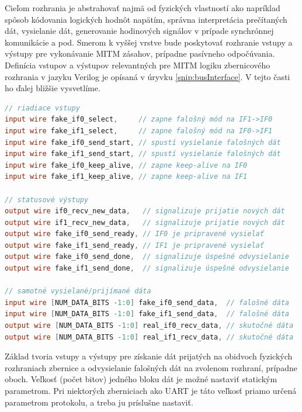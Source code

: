 Cieľom rozhrania je abstrahovať najmä od fyzických vlastností ako napríklad spôsob kódovania logických hodnôt napätím, správna interpretácia prečítaných dát, vysielanie dát, generovanie hodinových signálov v prípade synchrónnej komunikácie a pod. Smerom k vyššej vrstve bude poskytovať rozhranie vstupy a výstupy pre vykonávanie MITM zásahov, prípadne pasívneho odpočúvania. Definícia vstupov a výstupov relevantných pre MITM logiku zbernicového rozhrania v jazyku Verilog je opísaná v úryvku \ref{snip:busInterface}. V tejto časti ho ďalej bližšie vysvetlíme.

\begin{lstlisting}[float,language=Verilog,caption={Definícia vstupov a výstupov zbernicového rozhrania pre MITM logiku. Parameter NUM\_DATA\_BITS nastaví veľkosť bloku prijímaných/vysielaných dát.},label=snip:busInterface]
// riadiace vstupy
input wire fake_if0_select,     // zapne falošný mód na IF1->IF0
input wire fake_if1_select,     // zapne falošný mód na IF0->IF1
input wire fake_if0_send_start, // spustí vysielanie falošných dát
input wire fake_if1_send_start, // spustí vysielanie falošných dát
input wire fake_if0_keep_alive, // zapne keep-alive na IF0
input wire fake_if1_keep_alive, // zapne keep-alive na IF1

// statusové výstupy
output wire if0_recv_new_data,   // signalizuje prijatie nových dát
output wire if1_recv_new_data,   // signalizuje prijatie nových dát
output wire fake_if0_send_ready, // IF0 je pripravené vysielať   
output wire fake_if1_send_ready, // IF1 je pripravené vysielať   
output wire fake_if0_send_done,  // signalizuje úspešné odvysielanie
output wire fake_if1_send_done,  // signalizuje úspešné odvysielanie

// samotné vysielané/prijímané dáta
input wire [NUM_DATA_BITS -1:0] fake_if0_send_data,  // falošné dáta
input wire [NUM_DATA_BITS -1:0] fake_if1_send_data,  // falošné dáta
output wire [NUM_DATA_BITS -1:0] real_if0_recv_data, // skutočné dáta
output wire [NUM_DATA_BITS -1:0] real_if1_recv_data, // skutočné dáta
\end{lstlisting}

Základ tvoria vstupy a výstupy pre získanie dát prijatých na obidvoch fyzických rozhraniach zbernice a odvysielanie falošných dát na zvolenom rozhraní, prípadne oboch. Veľkosť (počet bitov) jedného bloku dát je možné nastaviť statickým parametrom. Pri niektorých zberniciach ako UART je táto veľkosť priamo určená parametrom protokolu, a treba ju príslušne nastaviť.

